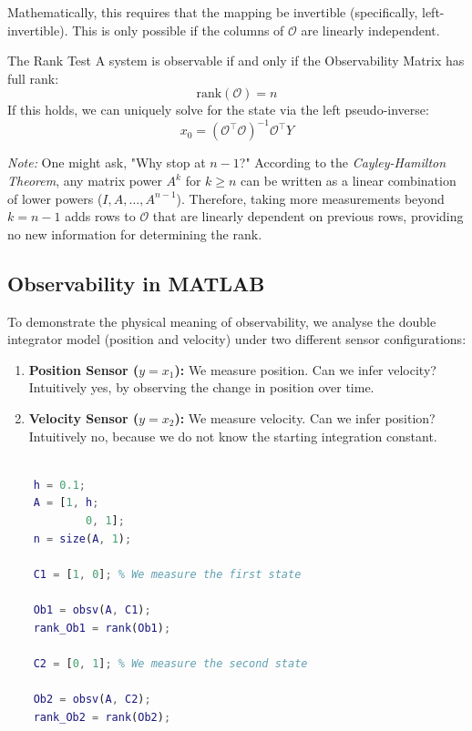 Mathematically, this requires that the mapping be invertible (specifically, left-invertible). This is only possible if the columns of $\mathcal{O}$ are linearly independent.

\begin{summarybox}{The Rank Test}
	A system is observable if and only if the Observability Matrix has full rank:
	\begin{equation*}
		\text{rank}(\mathcal{O}) = n
	\end{equation*}
	If this holds, we can uniquely solve for the state via the left pseudo-inverse:
	\[ x_0 = (\mathcal{O}^\top \mathcal{O})^{-1} \mathcal{O}^\top {Y} \]
\end{summarybox}

\textit{Note:} One might ask, "Why stop at $n-1$?" According to the \emph{Cayley-Hamilton Theorem}, any matrix power $A^k$ for $k \ge n$ can be written as a linear combination of lower powers ($I, A, \dots, A^{n-1}$). Therefore, taking more measurements beyond $k=n-1$ adds rows to $\mathcal{O}$ that are linearly dependent on previous rows, providing no new information for determining the rank.

\subsection{Observability in MATLAB}

To demonstrate the physical meaning of observability, we analyse the double integrator model (position and velocity) under two different sensor configurations:
\begin{enumerate}
	\item \textbf{Position Sensor ($y=x_1$):} We measure position. Can we infer velocity? Intuitively yes, by observing the change in position over time.
	\item \textbf{Velocity Sensor ($y=x_2$):} We measure velocity. Can we infer position? Intuitively no, because we do not know the starting integration constant.
\end{enumerate}

\begin{lstlisting}[language=Matlab, caption={MATLAB script comparing two sensor configurations.}, label={lst:matlab_observability}]

	h = 0.1;
	A = [1, h; 
			0, 1];
	n = size(A, 1);
	
	C1 = [1, 0]; % We measure the first state
	
	Ob1 = obsv(A, C1);
	rank_Ob1 = rank(Ob1);
	
	C2 = [0, 1]; % We measure the second state
	
	Ob2 = obsv(A, C2);
	rank_Ob2 = rank(Ob2);
	
\end{lstlisting}

